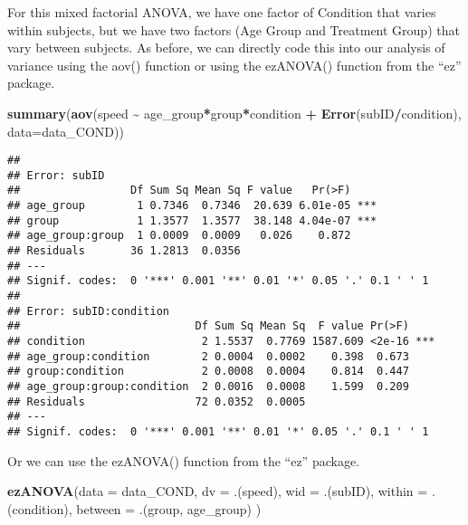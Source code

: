 \documentclass[]{article}
\newenvironment{Shaded}{\begin{snugshade}}{\end{snugshade}}
\newcommand{\DataTypeTok}[1]{\textcolor[rgb]{0.13,0.29,0.53}{#1}}
\newcommand{\KeywordTok}[1]{\textcolor[rgb]{0.13,0.29,0.53}{\textbf{#1}}}
\newcommand{\NormalTok}[1]{#1}
\newcommand{\OperatorTok}[1]{\textcolor[rgb]{0.81,0.36,0.00}{\textbf{#1}}}
\newcommand{\StringTok}[1]{\textcolor[rgb]{0.31,0.60,0.02}{#1}}
\begin{document}
For this mixed factorial ANOVA, we have one factor of Condition that
varies within subjects, but we have two factors (Age Group and Treatment
Group) that vary between subjects. As before, we can directly code this
into our analysis of variance using the aov() function or using the
ezANOVA() function from the ``ez'' package.

\begin{Shaded}
\begin{Highlighting}[]
\KeywordTok{summary}\NormalTok{(}\KeywordTok{aov}\NormalTok{(speed }\OperatorTok{\textasciitilde{}}\StringTok{ }\NormalTok{age\_group}\OperatorTok{*}\NormalTok{group}\OperatorTok{*}\NormalTok{condition }\OperatorTok{+}\StringTok{ }\KeywordTok{Error}\NormalTok{(subID}\OperatorTok{/}\NormalTok{condition), }\DataTypeTok{data=}\NormalTok{data\_COND))}
\end{Highlighting}
\end{Shaded}

\begin{verbatim}
## 
## Error: subID
##                 Df Sum Sq Mean Sq F value   Pr(>F)    
## age_group        1 0.7346  0.7346  20.639 6.01e-05 ***
## group            1 1.3577  1.3577  38.148 4.04e-07 ***
## age_group:group  1 0.0009  0.0009   0.026    0.872    
## Residuals       36 1.2813  0.0356                     
## ---
## Signif. codes:  0 '***' 0.001 '**' 0.01 '*' 0.05 '.' 0.1 ' ' 1
## 
## Error: subID:condition
##                           Df Sum Sq Mean Sq  F value Pr(>F)    
## condition                  2 1.5537  0.7769 1587.609 <2e-16 ***
## age_group:condition        2 0.0004  0.0002    0.398  0.673    
## group:condition            2 0.0008  0.0004    0.814  0.447    
## age_group:group:condition  2 0.0016  0.0008    1.599  0.209    
## Residuals                 72 0.0352  0.0005                    
## ---
## Signif. codes:  0 '***' 0.001 '**' 0.01 '*' 0.05 '.' 0.1 ' ' 1
\end{verbatim}

Or we can use the ezANOVA() function from the ``ez'' package.

\begin{Shaded}
\begin{Highlighting}[]
\KeywordTok{ezANOVA}\NormalTok{(}\DataTypeTok{data =}\NormalTok{ data\_COND, }
    \DataTypeTok{dv =}\NormalTok{ .(speed),}
    \DataTypeTok{wid =}\NormalTok{ .(subID),}
    \DataTypeTok{within =}\NormalTok{ .(condition),}
    \DataTypeTok{between =}\NormalTok{ .(group, age\_group)}
\NormalTok{)}
\end{Highlighting}
\end{Shaded}
\end{document}
